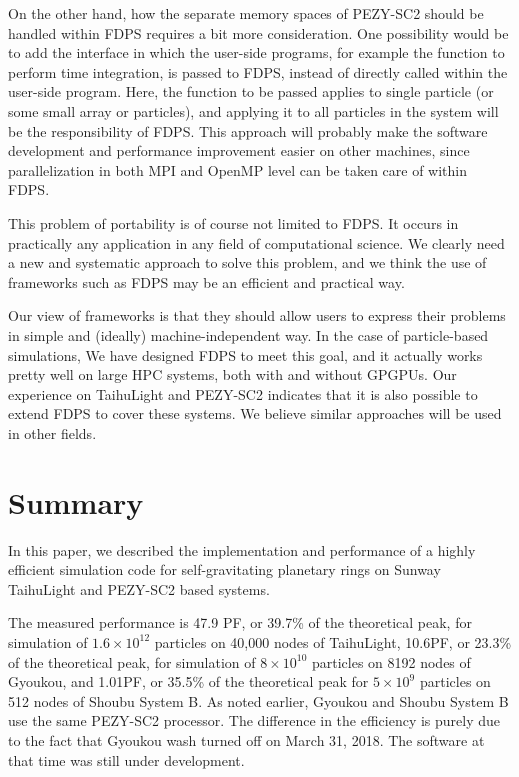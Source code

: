 \documentclass[conference]{IEEEtran}
\begin{document}
On the other hand, how the separate memory spaces of PEZY-SC2 should
be handled within FDPS requires a bit more consideration. One
possibility would be to add the interface in which the user-side
programs, for example the function to perform time integration, is
passed to FDPS, instead of directly called within the user-side
program. Here, the function to be passed applies to single particle
(or some small array or particles), and applying it to all particles
in the system will be the responsibility of FDPS.  This approach will
probably make the software development and performance improvement
easier on other machines, since parallelization in both MPI and OpenMP
level can be taken care of within FDPS. 

This problem of portability is of course not limited to FDPS. It
occurs in practically any application in any field of
computational science. We clearly need a new and systematic approach
to solve this problem, and we think the use of frameworks such as
FDPS may be an efficient and practical way.

Our view of frameworks is that they should allow users to express
their problems in simple and (ideally) machine-independent way. In the
case of particle-based simulations, We have designed FDPS to meet this
goal, and it actually works pretty well on large HPC systems, both
with and without GPGPUs. Our experience on TaihuLight and PEZY-SC2
indicates that it is also possible to extend FDPS to cover these
systems. We believe similar approaches will be used in other fields. 

\section{Summary}
\label{sect:summary}

In this paper, we described the implementation and performance of
a highly efficient simulation code for self-gravitating planetary
rings on  Sunway TaihuLight and PEZY-SC2 based systems.

The measured performance is 47.9 PF, or 39.7\% of the theoretical
peak, for simulation of $1.6\times 10^{12}$ particles on 40,000 nodes
of TaihuLight,  10.6PF, or 23.3\% of the theoretical peak, for
simulation of $8\times 10^{10}$ particles on 8192 nodes of Gyoukou,
and 1.01PF, or 35.5\% of the theoretical peak for 
$5\times 10^{9}$ particles on 512 nodes of Shoubu System B. As noted
earlier, Gyoukou and Shoubu System B use the same PEZY-SC2
processor. The difference in the efficiency is purely due to the fact
that Gyoukou wash turned off on March 31, 2018. The software at that
time was still under development.
\end{document}
